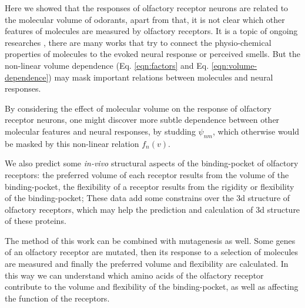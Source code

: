 \documentclass[11pt]{paper} %
\begin{document}
Here we showed that the responses of olfactory receptor neurons are related to the molecular volume of odorants, 
apart from that, it is not clear which other features of molecules are measured by olfactory receptors. 
It is a topic of ongoing researches , 
there are many works that try to connect the physio-chemical properties of molecules to the evoked neural response or perceived smells.
But the non-linear volume dependence (Eq. \ref{eqn:factors} and Eq. \ref{eqn:volume-dependence})  
may mask important relations between molecules and neural responses.

By considering the effect of molecular volume on the response of olfactory receptor neurons, 
one might discover more subtle dependence between other molecular features and neural responses, by studding $\psi_{nm}$, 
which otherwise would be masked by this non-linear relation $f_n(v)$.

We also predict some {\it in-vivo} structural aspects of  the binding-pocket of olfactory receptors:
the preferred volume of each receptor results from the volume of the binding-pocket,
the flexibility of a receptor results from the rigidity or flexibility of the binding-pocket; 
These data add some constrains over the 3d structure of olfactory receptors, 
which may help the prediction and calculation of 3d structure of these proteins. 

The method of this work can be combined with mutagenesis as well. 
Some genes of an olfactory receptor are mutated, 
then its response to a selection of molecules are measured and finally the preferred volume and flexibility are calculated.
In this way we can understand which amino acids of the olfactory receptor contribute to the volume and flexibility of the binding-pocket, 
as well as affecting the function of the receptors.
\end{document}
